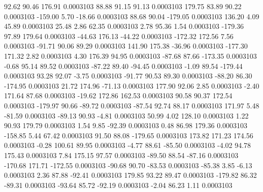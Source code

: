        92.62       90.46      176.91     0.0003103
       88.88       91.15       91.13     0.0003103
      179.75       83.89       90.22     0.0003103
     -159.00        5.70      -18.66     0.0003103
       88.68       90.04     -179.05     0.0003103
      136.20        4.09       45.89     0.0003103
       25.48        2.86       62.35     0.0003103
        2.78       95.36        1.54     0.0003103
     -179.36       97.89      179.64     0.0003103
      -44.63      176.13      -44.22     0.0003103
     -172.32      172.56        7.56     0.0003103
      -91.71       90.06       89.29     0.0003103
      141.90      175.38      -36.96     0.0003103
     -177.30      171.32        2.82     0.0003103
        4.30      176.39       94.95     0.0003103
      -87.68       87.66     -173.35     0.0003103
       -0.68       95.14       89.52     0.0003103
      -87.22       89.40      -94.45     0.0003103
       -1.09       89.54     -179.44     0.0003103
       93.28       92.07       -3.75     0.0003103
      -91.77       90.53       89.30     0.0003103
      -88.20       86.30     -174.95     0.0003103
       21.72      174.96      -71.13     0.0003103
      177.90       92.06        2.85     0.0003103
       -2.40      171.64       87.68     0.0003103
      -19.62      172.86      162.53     0.0003103
       90.58       90.37      172.54     0.0003103
     -179.97       90.66      -89.72     0.0003103
      -87.54       92.74       88.17     0.0003103
      171.97        5.48      -81.59     0.0003103
      -89.13       90.93       -4.81     0.0003103
       50.99        4.02      128.10     0.0003103
        1.22       90.93      179.79     0.0003103
        1.54        9.85      -92.39     0.0003103
        0.48       86.98      179.36     0.0003103
     -158.85        5.44       67.42     0.0003103
       91.50       88.08     -179.65     0.0003103
      173.82      171.23      174.56     0.0003103
       -0.28      100.61       89.95     0.0003103
       -4.77       88.61      -85.50     0.0003103
       -4.02       94.78      175.43     0.0003103
        7.84      175.15       97.57     0.0003103
      -89.50       88.54      -87.16     0.0003103
     -170.68      171.71     -172.55     0.0003103
      -90.68       90.70      -83.53     0.0003103
      -85.38        3.85       -6.13     0.0003103
        2.36       87.88      -92.41     0.0003103
      179.85       93.22       89.47     0.0003103
     -179.82       86.32      -89.31     0.0003103
      -93.64       85.72      -92.19     0.0003103
       -2.04       86.23        1.11     0.0003103
